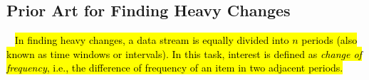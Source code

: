 \begin{comment}
Realizing that it is unnecessary and harmful to record frequencies of cold items, the idea of the second kind of solution, \texttt{record part}, records the information of only hot items.
%
For this kind of solution, the most well-known algorithm is SpaceSaving \cite{spacesaving}. 
It has various variants: the Unbiased SpaceSaving \cite{unbiasedsketch}, Cold filter, and more \cite{css}.
The key operation of SpaceSaving is as follows. It uses a min-heap-like data structure -- Stream-Summary. When a new item $e$ arrives, it increments the smallest frequency $f_{min}$ in Stream-Summary by 1, and then replaces the smallest item with $e$.
%
SpaceSaving has only over-estimation error.
%
Based on SpaceSaving, the Unbiased SpaceSaving \cite{unbiasedsketch} makes a small modification: when a new item $e$ arrives, it also increments the smallest frequency $f_{min}$ by 1, but then replaces the smallest item with $e$ with a probability.
%
The Unbiased SpaceSaving is proved theoretically to be unbiased.
%
For SpaceSaving and the Unbiased SpaceSaving, every cold item will increment the smallest frequency, and since most items are cold in practice, leads to poor accuracy.
%
Noticing the negative effect of cold items, Cold filter \cite{coldfilter} filters cold items using a small CU sketch, achieving a much higher accuracy.
%
In contrast, we aim to minimize the negative effect above with no auxiliary data structures.
\end{comment}

\vvv
\presec
\subsection{Prior Art for Finding Heavy Changes}\postsec~
\hl{
In finding heavy changes, a data stream is equally divided into $n$ periods (also known as time windows or intervals). In this task, interest is defined as \textit{change of frequency}, i.e., the difference of frequency of an item in two adjacent periods.
}


